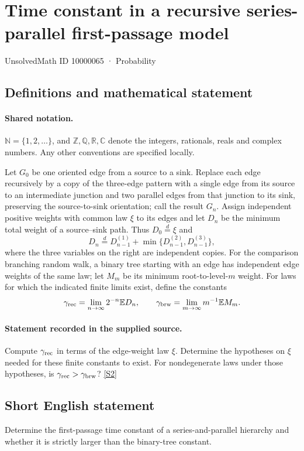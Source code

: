 \documentclass[11pt]{article}
\newcommand{\sref}[2]{\hyperlink{source:#1:#2}{[S#2]}}
\begin{document}
\setcounter{section}{10000064}
\section{Time constant in a recursive series-parallel first-passage model}\label{10000065}
{\small\sffamily UnsolvedMath ID 10000065 · Probability}
\subsection{Definitions and mathematical statement}

\paragraph{Shared notation.}$\mathbb N=\{1,2,\ldots\}$, and $\mathbb Z,\mathbb Q,\mathbb R,\mathbb C$ denote the integers, rationals, reals and complex numbers. Any other conventions are specified locally.


Let $G_0$ be one oriented edge from a source to a sink. Replace each edge recursively by a copy of the three-edge pattern with a single edge from its source to an intermediate junction and two parallel edges from that junction to its sink, preserving the source-to-sink orientation; call the result $G_n$. Assign independent positive weights with common law $\xi$ to its edges and let $D_n$ be the minimum total weight of a source--sink path. Thus $D_0\stackrel d=\xi$ and
\[D_n\stackrel d=D_{n-1}^{(1)}+\min\{D_{n-1}^{(2)},D_{n-1}^{(3)}\},\]
where the three variables on the right are independent copies. For the comparison branching random walk, a binary tree starting with an edge has independent edge weights of the same law; let $M_m$ be its minimum root-to-level-$m$ weight. For laws for which the indicated finite limits exist, define the constants
\[\gamma_{\rm rec}=\lim_{n\to\infty}2^{-n}\mathbb E D_n,\qquad\gamma_{\rm brw}=\lim_{m\to\infty}m^{-1}\mathbb E M_m.\]
\paragraph{Statement recorded in the supplied source.}
Compute $\gamma_{\rm rec}$ in terms of the edge-weight law $\xi$. Determine the hypotheses on $\xi$ needed for these finite constants to exist. For nondegenerate laws under those hypotheses, is $\gamma_{\rm rec}>\gamma_{\rm brw}$? \sref{10000065}{2}
\subsection{Short English statement}
Determine the first-passage time constant of a series-and-parallel hierarchy and whether it is strictly larger than the binary-tree constant.
\end{document}
